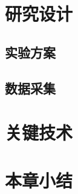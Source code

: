 \section{研究设计}
\label{sec:design}

\subsection{实验方案}
\label{sec:experiment}

\subsection{数据采集}
\label{sec:data}

\section{关键技术}
\label{sec:techniques}

\section{本章小结}
\label{sec:method_summary}
